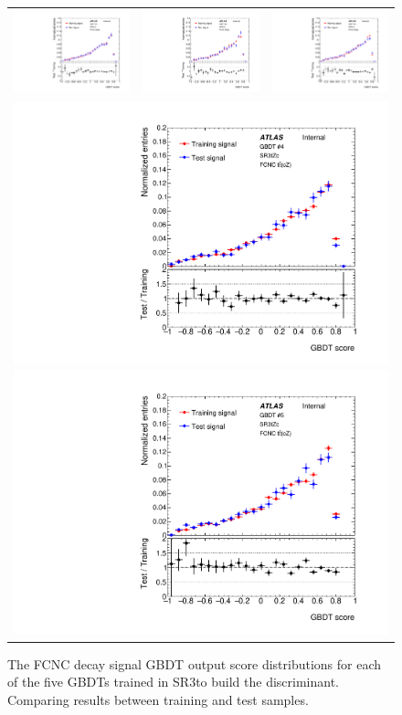 \begin{figure}[htbp]
	\centering
	\begin{tabular}{ccc}
		\includegraphics[width=.29\textwidth]{Chapters/CH6/figures/SR3_UsingSMT/BDT/GBDT_signal_Fold1} &
		\includegraphics[width=.29\textwidth]{Chapters/CH6/figures/SR3_UsingSMT/BDT/GBDT_signal_Fold2} &
		\includegraphics[width=.29\textwidth]{Chapters/CH6/figures/SR3_UsingSMT/BDT/GBDT_signal_Fold3} \\ 
		\multicolumn{3}{c}{
			\includegraphics[width=.29\textwidth]{Chapters/CH6/figures/SR3_UsingSMT/BDT/GBDT_signal_Fold4}
			\includegraphics[width=.29\textwidth]{Chapters/CH6/figures/SR3_UsingSMT/BDT/GBDT_signal_Fold5}} \\
	\end{tabular}
	\caption{ The FCNC \tZc \ttbar decay signal GBDT output score distributions for each of the five GBDTs trained in SR3\tZc to build the \Dthree discriminant. 
		Comparing results between training and test samples.
	}%
	\label{fig:separation:SR3:GBDTsig}
\end{figure}

